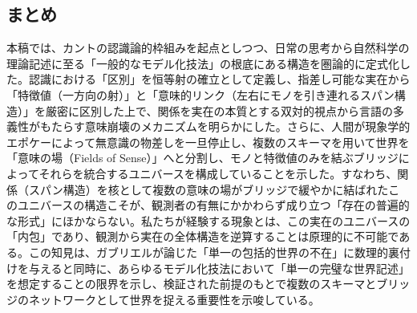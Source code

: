 \documentclass[11pt,a4paper,luatex]{jlreq}
\theoremstyle{definition}
\theoremstyle{plain}
\begin{document}
\subsection*{まとめ}

本稿では、カントの認識論的枠組みを起点としつつ、日常の思考から自然科学の理論記述に至る「一般的なモデル化技法」の根底にある構造を圏論的に定式化した。認識における「区別」を恒等射の確立として定義し、指差し可能な実在から「特徴値（一方向の射）」と「意味的リンク（左右にモノを引き連れるスパン構造）」を厳密に区別した上で、関係を実在の本質とする双対的視点から言語の多義性がもたらす意味崩壊のメカニズムを明らかにした。さらに、人間が現象学的エポケーによって無意識の物差しを一旦停止し、複数のスキーマを用いて世界を「意味の場（Fields of Sense）」へと分割し、モノと特徴値のみを結ぶブリッジによってそれらを統合するユニバースを構成していることを示した。すなわち、関係（スパン構造）を核として複数の意味の場がブリッジで緩やかに結ばれたこのユニバースの構造こそが、観測者の有無にかかわらず成り立つ「存在の普遍的な形式」にほかならない。私たちが経験する現象とは、この実在のユニバースの「内包」であり、観測から実在の全体構造を逆算することは原理的に不可能である。この知見は、ガブリエルが論じた「単一の包括的世界の不在」に数理的裏付けを与えると同時に、あらゆるモデル化技法において「単一の完璧な世界記述」を想定することの限界を示し、検証された前提のもとで複数のスキーマとブリッジのネットワークとして世界を捉える重要性を示唆している。
\end{document}
